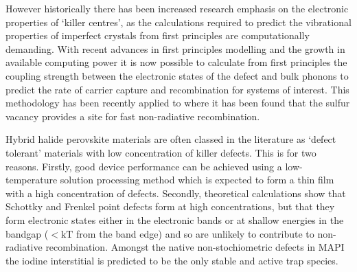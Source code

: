 However historically there has been increased research emphasis on the electronic properties of `killer centres', as the calculations required to predict the vibrational properties of imperfect crystals from first principles are computationally demanding.
With recent advances in first principles modelling \autocite{Alkauskas2014}%
and the growth in available computing power\autocite{}
it is now possible to calculate from first principles the coupling strength between the electronic states of the defect and bulk phonons to predict the rate of carrier capture and recombination for systems of interest. 
This methodology has been recently applied to  where it has been found that the sulfur vacancy provides a site for fast non-radiative recombination.

Hybrid halide perovskite materials are often classed in the literature as `defect tolerant' materials with low concentration of killer defects. This is for two reasons. 
Firstly, good device performance can be achieved using a low-temperature solution processing method which is expected to form a thin film with a high concentration of defects. 
Secondly, theoretical calculations show that Schottky and Frenkel point defects form at high concentrations, but that they form electronic states either in the electronic bands or at shallow energies in the bandgap ($< \mathrm{kT}$ from the band edge) and so are unlikely to contribute to non-radiative recombination.
Amongst the native non-stochiometric defects in MAPI the iodine interstitial is predicted to be the only stable and active trap species.



